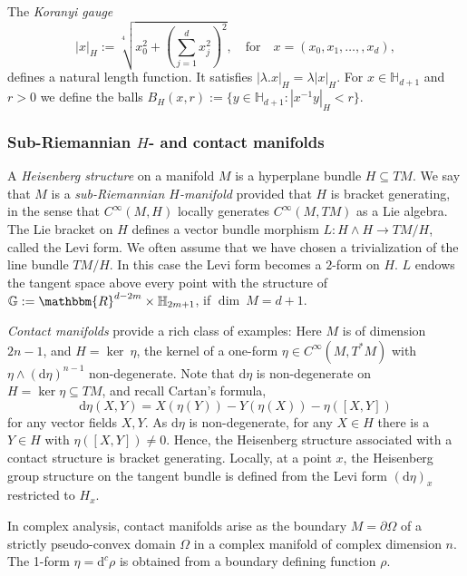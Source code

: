 \documentclass[10pt]{amsart}
\theoremstyle{remark}
\theoremstyle{definition}
\begin{document}
The \emph{Koranyi gauge}
$$|x|_H:=\sqrt[4]{x_0^2+\left(\sum_{j=1}^dx_j^2\right)^2},\quad \mbox{for}\quad x=(x_0,x_1,\ldots, ,x_d),$$
defines a natural length function. It satisfies $|\lambda.x|_H=\lambda|x|_H$. For $x\in \mathbb{H}_{d+1}$ and $r>0$ we define the balls
$B_H(x,r):=\{y\in \mathbb{H}_{d+1}:|x^{-1}y|_H<r\}.$ 

\subsubsection{Sub-Riemannian $H$- and contact manifolds} 

A  \emph{Heisenberg structure} on a manifold $M$ is a hyperplane bundle $H\subseteq TM$. We say that $M$ is a \emph{sub-Riemannian $H$-manifold} provided that $H$ is bracket generating, in the sense that $C^\infty(M,H)$ locally generates $C^\infty(M,TM)$ as a Lie algebra. The Lie bracket on $H$ defines a vector bundle morphism $L:H\wedge H \to TM/H$, called the Levi form. We often assume that we have chosen a trivialization of the line bundle $TM/H$. In this case the Levi form becomes a $2$-form on $H$. $L$ endows the tangent space above every point with the structure of $\mathbb{G}:={\mathbbm{R}}^{d-2m}\times\mathbb{H}_{2m+1}$, if $\dim \ M = d+1$.  

\emph{Contact manifolds} provide a rich class of examples: Here $M$ is of dimension $2n-1$, and $H = \ker \ \eta$, the kernel of a one-form $\eta \in C^\infty(M,T^*M)$ with $\eta\wedge ({\mathrm{d}}\eta)^{n-1}$ non-degenerate. Note that ${\mathrm{d}} \eta$ is non-degenerate on $H=\ker\eta\subseteq TM$, and recall Cartan's formula,
\[{\mathrm{d}} \eta(X,Y)=X(\eta(Y))-Y(\eta(X))-\eta([X,Y])\]
for any vector fields $X,Y$. As ${\mathrm{d}} \eta$ is non-degenerate, for any $X\in H$ there is a $Y\in H$ with $\eta([X,Y])\neq 0$. Hence, the Heisenberg structure associated with a contact structure is bracket generating. Locally, at a point $x$, the Heisenberg group structure on the tangent bundle is defined from the Levi form $({\mathrm{d}} \eta)_x$ restricted to $H_x$.

In complex analysis, contact manifolds arise as the boundary $M = \partial \Omega$ of a strictly pseudo-convex domain $\Omega$ in a complex manifold of complex dimension $n$. The 1-form $\eta = {\mathrm{d}}^c\rho$ is obtained from a boundary defining function $\rho$.  
\end{document}
